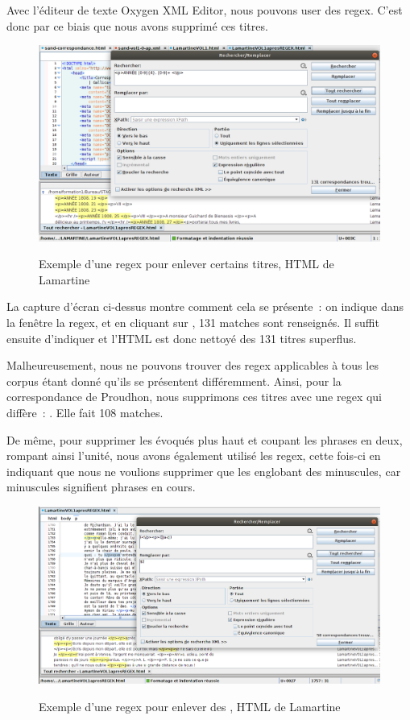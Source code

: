 Avec l'éditeur de texte Oxygen XML Editor, nous pouvons user des regex. C'est donc par ce biais que nous avons supprimé ces titres. 

\begin{figure}[ht]
    \centering
    \caption{Exemple d'une regex pour enlever certains titres, HTML de Lamartine}
    \includegraphics[width=16cm]{images/titres_annee_lamartine.png}
    \label{titres_annee_lamartine}
\end{figure}

La capture d'écran ci-dessus montre comment cela se présente~: on indique dans la fenêtre la regex, et en cliquant sur , 131 matches sont renseignés. Il suffit ensuite d'indiquer  et l'HTML est donc nettoyé des 131 titres superflus. 

Malheureusement, nous ne pouvons trouver des regex applicables à tous les corpus étant donné qu'ils se présentent différemment. Ainsi, pour la correspondance de Proudhon, nous supprimons ces titres avec une regex qui diffère~: . Elle fait 108 matches.

De même, pour supprimer les  évoqués plus haut et coupant les phrases en deux, rompant ainsi l'unité, nous avons également utilisé les regex, cette fois-ci en indiquant que nous ne voulions supprimer que les  englobant des minuscules, car minuscules signifient phrases en cours.

\begin{figure}[ht]
    \centering
    \caption{Exemple d'une regex pour enlever des , HTML de Lamartine}
    \includegraphics[width=16cm]{images/regex_p.png}
    \label{regex_p}
\end{figure}

